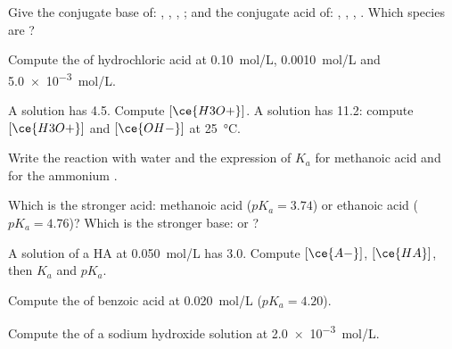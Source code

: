 \begin{exercise}[$\star$]\label{exo:g12:ka-and-pka:1}
Give the conjugate base of: , , , ;
and the conjugate acid of: , , , .
Which species are ?
\end{exercise}

\begin{exercise}[$\star$]\label{exo:g12:ka-and-pka:2}
Compute the  of hydrochloric acid at \qty{0.10}{mol/L},
\qty{0.0010}{mol/L} and \qty{5.0e-3}{mol/L}.
\end{exercise}

\begin{exercise}[$\star$]\label{exo:g12:ka-and-pka:3}
A solution has  4.5. Compute $[\ce{H3O+}]$. A solution has  11.2:
compute $[\ce{H3O+}]$ and $[\ce{OH-}]$ at \qty{25}{\celsius}.
\end{exercise}

\begin{exercise}[$\star$]\label{exo:g12:ka-and-pka:4}
Write the reaction with water and the expression of $K_a$ for methanoic
acid and for the ammonium .
\end{exercise}

\begin{exercise}[$\star$]\label{exo:g12:ka-and-pka:5}
Which is the stronger acid: methanoic acid ($pK_a = 3.74$) or ethanoic
acid ($pK_a = 4.76$)? Which is the stronger base:  or
?
\end{exercise}

\begin{exercise}[$\star\star$]\label{exo:g12:ka-and-pka:6}
A solution of a  HA at \qty{0.050}{mol/L} has  3.0. Compute
$[\ce{A-}]$, $[\ce{HA}]$, then $K_a$ and $pK_a$.
\end{exercise}

\begin{exercise}[$\star\star$]\label{exo:g12:ka-and-pka:7}
Compute the  of benzoic acid at \qty{0.020}{mol/L} ($pK_a = 4.20$).
\end{exercise}

\begin{exercise}[$\star\star$]\label{exo:g12:ka-and-pka:8}
Compute the  of a sodium hydroxide solution at \qty{2.0e-3}{mol/L}.
\end{exercise}

